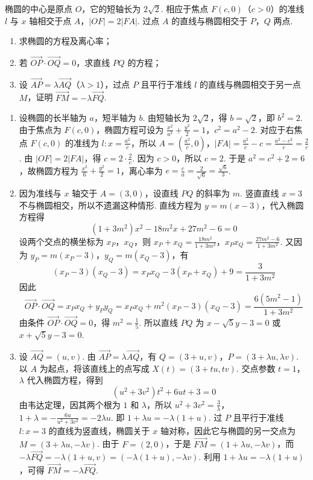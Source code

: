 \begin{problem}
椭圆的中心是原点 \(O\)，它的短轴长为 \(2\sqrt{2}\). 相应于焦点 \(F(c,0)\)（\(c > 0\)）的准线 \(l\) 与 \(x\) 轴相交于点 \(A\)，\(|OF| = 2|FA|\). 过点 \(A\) 的直线与椭圆相交于 \(P\)，\(Q\) 两点.

\begin{enumerate}
\item 求椭圆的方程及离心率；
\item 若 \(\overrightarrow{OP} \cdot \overrightarrow{OQ} = 0\)，求直线 \(PQ\) 的方程；
\item 设 \(\overrightarrow{AP} = \lambda \overrightarrow{AQ}\)（\(\lambda > 1\)），过点 \(P\) 且平行于准线 \(l\) 的直线与椭圆相交于另一点 \(M\)，证明 \(\overrightarrow{FM} = -\lambda \overrightarrow{FQ}\).
\end{enumerate}
\end{problem}

\begin{solution}
\begin{enumerate}
\item 设椭圆的长半轴为 \(a\)，短半轴为 \(b\). 由短轴长为 \(2\sqrt2\)，得 \(b=\sqrt2\)，即 \(b^2=2\). 由于焦点为 \(F(c,0)\)，椭圆方程可设为
\(\frac{x^2}{a^2}+\frac{y^2}{2}=1\)，\(c^2=a^2-2\).
对应于右焦点 \(F(c,0)\) 的准线为 \(l:x=\frac{a^2}{c}\)，所以
\(A=\left(\frac{a^2}{c},0\right)\)，\(|FA|=\frac{a^2}{c}-c=\frac{a^2-c^2}{c}=\frac2c\).
由 \(|OF|=2|FA|\)，得 \(c=2\cdot\frac2c\). 因为 \(c>0\)，所以 \(c=2\). 于是 \(a^2=c^2+2=6\)，故椭圆方程为 \(\frac{x^2}{6}+\frac{y^2}{2}=1\)，离心率为 \(e=\frac ca=\frac2{\sqrt6}=\frac{\sqrt6}{3}\).

\item 因为准线与 \(x\) 轴交于 \(A=(3,0)\)，设直线 \(PQ\) 的斜率为 \(m\). 竖直直线 \(x=3\) 不与椭圆相交，所以不遗漏这种情形. 直线方程为 \(y=m(x-3)\)，代入椭圆方程得
\[
(1+3m^2)x^2-18m^2x+27m^2-6=0
\]
设两个交点的横坐标为 \(x_P\)，\(x_Q\)，则
\(x_P+x_Q=\frac{18m^2}{1+3m^2}\)，\(x_Px_Q=\frac{27m^2-6}{1+3m^2}\).
又因为 \(y_P=m(x_P-3)\)，\(y_Q=m(x_Q-3)\)，有
\[
(x_P-3)(x_Q-3)=x_Px_Q-3(x_P+x_Q)+9=\frac3{1+3m^2}
\]
因此
\[
\overrightarrow{OP}\cdot\overrightarrow{OQ}
=x_Px_Q+y_Py_Q
=x_Px_Q+m^2(x_P-3)(x_Q-3)
=\frac{6(5m^2-1)}{1+3m^2}
\]
由条件 \(\overrightarrow{OP}\cdot\overrightarrow{OQ}=0\)，得 \(m^2=\frac15\). 所以直线 \(PQ\) 为 \(x-\sqrt5y-3=0\) 或 \(x+\sqrt5y-3=0\).

\item 设 \(\overrightarrow{AQ}=(u,v)\). 由 \(\overrightarrow{AP}=\lambda\overrightarrow{AQ}\)，有 \(Q=(3+u,v)\)，\(P=(3+\lambda u,\lambda v)\). 以 \(A\) 为起点，将该直线上的点写成 \(X(t)=(3+tu,tv)\). 交点参数 \(t=1\)，\(\lambda\) 代入椭圆方程，得到
\[
(u^2+3v^2)t^2+6ut+3=0
\]
由韦达定理，因其两个根为 \(1\) 和 \(\lambda\)，所以
\(u^2+3v^2=\frac3\lambda\)，\(1+\lambda=-\frac{6u}{u^2+3v^2}=-2\lambda u\).
即 \(1+\lambda u=-\lambda(1+u)\). 过 \(P\) 且平行于准线 \(l:x=3\) 的直线为竖直线，椭圆关于 \(x\) 轴对称，因此它与椭圆的另一交点为 \(M=(3+\lambda u,-\lambda v)\). 由于 \(F=(2,0)\)，于是 \(\overrightarrow{FM}=(1+\lambda u,-\lambda v)\)，而 \(-\lambda\overrightarrow{FQ}=-\lambda(1+u,v)=(-\lambda(1+u),-\lambda v)\). 利用 \(1+\lambda u=-\lambda(1+u)\)，可得 \(\overrightarrow{FM}=-\lambda\overrightarrow{FQ}\).
\end{enumerate}
\end{solution}
